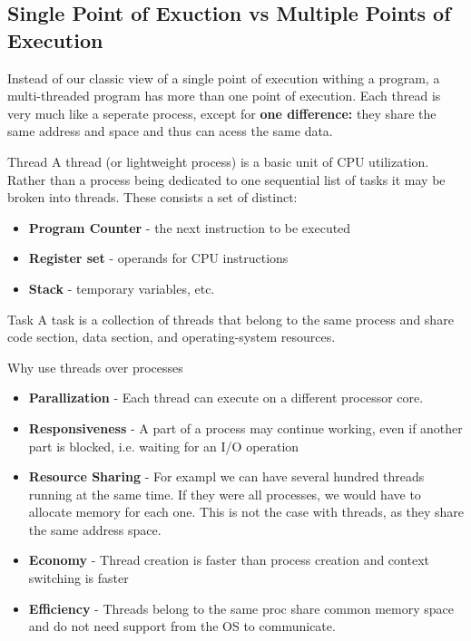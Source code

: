 \documentclass[a4paper, 10pt]{article}
\begin{document}
\subsection{Single Point of Exuction vs Multiple Points of Execution}
Instead of our classic view of a single point of execution withing a program, a multi-threaded program has more than one point of execution. Each thread is very much like a seperate process, except for \textbf{one difference:} they share the same address and space and thus can acess the same data.
\begin{definitionbox}{Thread}{}
    A thread (or lightweight process) is a basic unit of CPU utilization. Rather than a process being dedicated to one sequential list of tasks it may be broken into threads. These consists a set of distinct:
    \begin{itemize}
        \item \textbf{Program Counter} - the next instruction to be executed
        \item \textbf{Register set} - operands for CPU instructions
        \item \textbf{Stack} - temporary variables, etc.
    \end{itemize}
\end{definitionbox}
\begin{definitionbox}{Task}{}
    A task is a collection of threads that belong to the same process and share code section, data section, and operating-system resources.
\end{definitionbox}
\begin{conceptbox}{Why use threads over processes}{}
    \begin{itemize}
        \item \textbf{Parallization} - Each thread can execute on a different processor core.
        \item \textbf{Responsiveness} - A part of a process may continue working, even if another part is blocked, i.e. waiting for an I/O operation
        \item \textbf{Resource Sharing} - For exampl we can have several hundred threads running at the same time. If they were all processes, we would have to allocate memory for each one. This is not the case with threads, as they share the same address space.
        \item \textbf{Economy} - Thread creation is faster than process creation and context switching is faster
        \item \textbf{Efficiency} - Threads belong to the same proc share common memory space and do not need support from the OS to communicate.
    \end{itemize}
\end{conceptbox}
\end{document}
